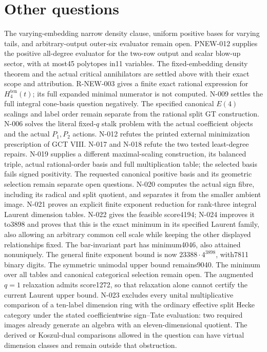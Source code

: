 \documentclass[11pt]{article}
\theoremstyle{definition}\newtheorem{definition}[theorem]{Definition}
\theoremstyle{remark}\newtheorem{remark}[theorem]{Remark}
\begin{document}
\section{Other questions}
The varying-embedding narrow density clause, uniform positive bases
for varying tails, and arbitrary-output outer-six evaluator remain open.
PNEW-012 supplies the positive all-degree evaluator for the two-row
output and scalar blow-up sector, with at most45 polytopes in11 variables.
The fixed-embedding density theorem and the actual critical
annihilators are settled above with their exact scope and attribution.
R-NEW-003 gives a finite exact rational expression for
$H^{\mathrm{ten}}_4(t)$; its full expanded minimal numerator is
not computed. N-009 settles the full integral cone-basis
question negatively. The specified canonical $E(4)$ scalings and
label order remain separate from the rational split GT construction.
N-006 solves the literal fixed-$q$ stalk problem with the actual
coefficient objects and the actual $P_1,P_2$ actions. N-012 refutes
the printed external minimization prescription of GCT VIII.
N-017 and N-018 refute the two tested least-degree repairs.
N-019 supplies a different maximal-scaling construction, its balanced
triple, actual rational-order basis and full multiplication table;
the selected basis fails signed positivity. The requested canonical
positive basis and its geometric selection remain separate open questions.
N-020 computes the actual sign fibre, including its radical and split
quotient, and separates it from the smaller ambient image. N-021 proves
an explicit finite exponent reduction for rank-three integral Laurent
dimension tables. N-022 gives the feasible score4194; N-024 improves
it to3898 and proves that this is the exact minimum in its specified
Laurent family, also allowing an arbitrary common cell scale while
keeping the other displayed relationships fixed. The bar-invariant part
has minimum4046, also attained nonuniquely. The general finite exponent
bound is now $23388\cdot4^{3898}$, with7811 binary digits.
The symmetric unimodal upper bound remains9040. The minimum over
all tables and canonical categorical selection remain open.
The augmented $q=1$ relaxation admits score1272, so that relaxation
alone cannot certify the current Laurent upper bound.
N-023 excludes every unital multiplicative comparison of a ten-label
dimension ring with the ordinary effective split Hecke category under
the stated coefficientwise sign--Tate evaluation: two required images
already generate an algebra with an eleven-dimensional quotient.
The derived or Koszul-dual comparisons allowed in the question can
have virtual dimension classes and remain outside that obstruction.
\end{document}
